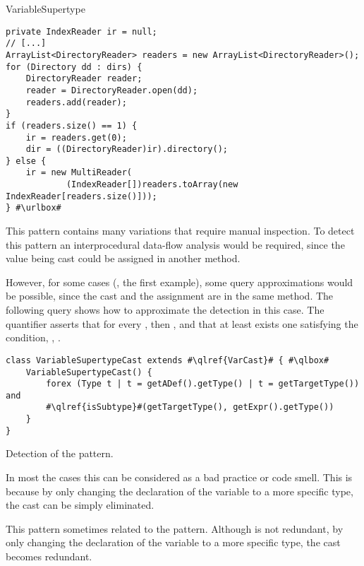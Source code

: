 \begin{pattern}{VariableSupertype}
\begin{verbatim}
private IndexReader ir = null;  
// [...]
ArrayList<DirectoryReader> readers = new ArrayList<DirectoryReader>();
for (Directory dd : dirs) {
    DirectoryReader reader;        
    reader = DirectoryReader.open(dd);
    readers.add(reader);
}
if (readers.size() == 1) {
    ir = readers.get(0);
    dir = ((DirectoryReader)ir).directory();
} else {
    ir = new MultiReader(
            (IndexReader[])readers.toArray(new IndexReader[readers.size()]));
} #\urlbox#
\end{verbatim}


\detection{}
This pattern contains many variations that require manual inspection.
To detect this pattern an interprocedural data-flow analysis would be required,
since the value being cast could be assigned in another method.

However, for some cases (\eg{}, the first example),
some query approximations would be possible,
since the cast and the assignment are in the same method.
The following query shows how to approximate the detection in this case.
The  quantifier asserts that for every ,
then ,
and that at least exists one  satisfying the condition,
\ie{}, .

\begin{listing}
\begin{verbatim}
class VariableSupertypeCast extends #\qlref{VarCast}# { #\qlbox#
	VariableSupertypeCast() {
		forex (Type t | t = getADef().getType() | t = getTargetType()) and
		#\qlref{isSubtype}#(getTargetType(), getExpr().getType())
	}
}
\end{verbatim}
\caption{Detection of the \thisp{} pattern.}
\label{lst:ql:VariableSupertype}
\end{listing}


\issues{}
In most the cases this can be considered as a bad practice or code smell.
This is because by only changing the declaration of the variable
to a more specific type, the cast can be simply eliminated.

This pattern sometimes related to the  pattern.
Although \thisp{} is not redundant,
by only changing the declaration of the variable to a more specific type,
the cast becomes redundant.

\end{pattern}
